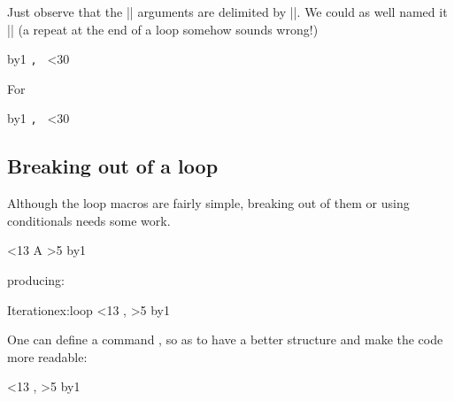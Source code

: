 Just observe that the |\loop| arguments are delimited by |\repeat|. We could as well named it |\endloop| (a repeat at the end of a loop somehow sounds wrong!)

\begin{teX}
\def\for#1\endfor{\def\body{#1}\iterate}
\def\iterate{\body\let\next=\iterate\else\let\next=\relax\fi\next}
\newcount\n
{}
\for
   \advance\n by1
     \texttt{\number\n, }  
   \ifnum\n<30
\endfor
\end{teX}  

\begin{texexample}{For}{}
\bgroup
\def\for#1\endfor{\def\body{#1}\iterate}
\def\iterates{\body\let\next=\iterates\else\let\next=\relax\fi\next}

\noindent\colorbox{gray!10}{\parbox{10cm}{\noindent
\newcount\n
{}
\for%
   \advance\n by1
     \texttt{\number\n, }%
   \ifnum\n<30%
\endfor%
}}
\egroup
\end{texexample}

\subsection{Breaking out of a loop}

Although the loop macros are fairly simple, breaking out of them or using conditionals needs some work.

\begin{teXXX}
\newcount\mycount
{}
\loop\ifnum\mycount<13
A 
\ifnum\mycount>5
    \let\iterate\relax
 \fi
 \advance\mycount by1\relax
\repeat
\end{teXXX}
\medskip
producing:
\medskip

\begin{texexample}{Iteration}{ex:loop}
\newcount\mycount
{}
\loop\ifnum\mycount<13
\the\mycount, 
\ifnum\mycount>5
    \let\iterate\relax
 \fi
 \advance\mycount by1\relax
\repeat
\end{texexample}

One can define a command \cmd{\break}, so as to have a better structure and make the code more readable:

\begin{teXXX}
\def\break{\let\iterate\relax}
\newcount\mycount
{}
\loop\ifnum\mycount<13
\the\mycount, 
\ifnum\mycount>5
    \break    
\fi
\advance\mycount by1\relax
\repeat
\end{teXXX}





